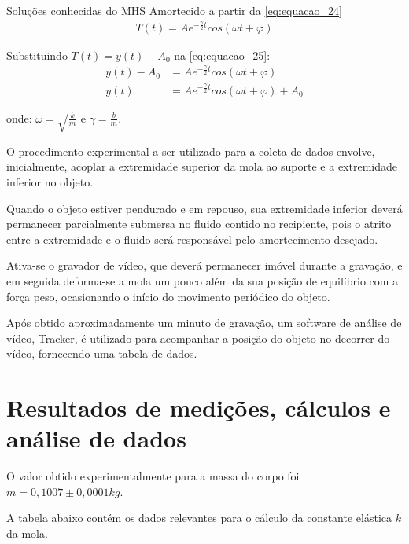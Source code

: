 \documentclass[12pt]{article}
\begin{document}
		Soluções conhecidas do MHS Amortecido a partir da \autoref{eq:equacao_24}
		\begin{align}
			T(t)=Ae^{-\frac{\gamma}{2}t}cos(\omega t+ \varphi) \label{eq:equacao_25}
		\end{align}		
		
		Substituindo $T(t)=y(t)-A_0$ na \autoref{eq:equacao_25}:
		\begin{align}
			y(t)-A_0&=Ae^{-\frac{\gamma}{2}t}cos(\omega t+ \varphi) \nonumber \\
			y(t)&=Ae^{-\frac{\gamma}{2}t}cos(\omega t+ \varphi)+A_0 \label{eq:equacao_26}
		\end{align}
		
		onde:
		$\omega=\sqrt{\frac{k}{m}}$ 
		e
		$\gamma=\frac{b}{m}$.
		
		O procedimento experimental a ser utilizado para a coleta de dados envolve, inicialmente, acoplar a extremidade superior da mola ao suporte e a extremidade inferior no objeto.
		
		Quando o objeto estiver pendurado e em repouso, sua extremidade inferior deverá permanecer parcialmente submersa no fluido contido no recipiente, pois o atrito entre a extremidade e o fluido será responsável pelo amortecimento desejado.
		
		Ativa-se o gravador de vídeo, que deverá permanecer imóvel durante a gravação, e em seguida deforma-se a mola um pouco além da sua posição de equilíbrio com a força peso, ocasionando o início do movimento periódico do objeto.
		
		Após obtido aproximadamente um minuto de gravação, um software de análise de vídeo, Tracker, é utilizado para acompanhar a posição do objeto no decorrer do vídeo, fornecendo uma tabela de dados.
		\newpage
				
	\section*{Resultados de medições, cálculos e análise de dados}
		
		O valor obtido experimentalmente para a massa do corpo foi $m=0,1007\pm0,0001 kg$.
		
		A tabela abaixo contém os dados relevantes para o cálculo da constante elástica $k$ da mola.
		
\end{document}
